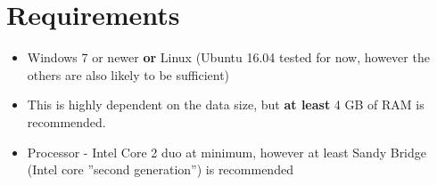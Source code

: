 \section{Requirements}
\begin{itemize}
\item Windows 7 or newer \textbf{or} Linux (Ubuntu 16.04 tested for now, however the others are also likely to be sufficient)
\item This is highly dependent on the data size, but \textbf{at least} 4 GB of RAM is recommended.
\item Processor - Intel Core 2 duo at minimum, however at least Sandy Bridge (Intel core ''second generation'') is recommended
\end{itemize}
